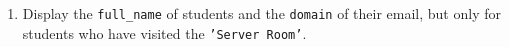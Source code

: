 \documentclass[12pt,a4paper]{article}
\begin{document}
\begin{enumerate}

\item Display the \texttt{full\_name} of students and the \texttt{domain} of their email, but only for students who have visited the \texttt{'Server Room'}.






\end{enumerate}
\end{document}

